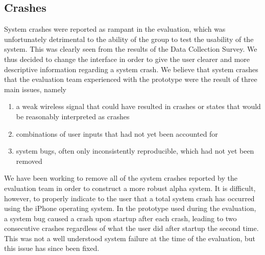 \documentclass[10pt,letterpaper]{article}
\begin{document}
\subsection*{Crashes}
System crashes were reported as rampant in the evaluation, which was unfortunately detrimental to the ability of the group to test the usability of the system. This was clearly seen from the results of the Data Collection Survey. We thus decided to change the interface in order to give the user clearer and more descriptive information regarding a system crash. We believe that system crashes that the evaluation team experienced with the prototype were the result of three main issues, namely
	\begin{enumerate}
	\item
	a weak wireless signal that could have resulted in crashes or states that would be reasonably interpreted as crashes
	\item
	combinations of user inputs that had not yet been accounted for
	\item
	system bugs, often only inconsistently reproducible, which had not yet been removed
	\end{enumerate}
We have been working to remove all of the system crashes reported by the evaluation team in order to construct a more robust alpha system. It is difficult, however, to properly indicate to the user that a total system crash has occurred using the iPhone operating system. In the prototype used during the evaluation, a system bug caused a crash upon startup after each crash, leading to two consecutive crashes regardless of what the user did after startup the second time. This was not a well understood system failure at the time of the evaluation, but this issue has since been fixed.
\end{document}
